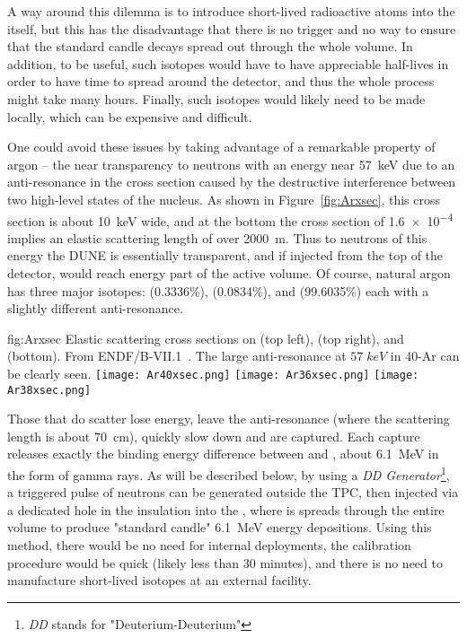 A way around this dilemma is to introduce short-lived radioactive atoms into the  itself, but this has the disadvantage that there is no trigger and no way to ensure that the standard candle decays spread out through the whole volume. In addition, to be useful, such isotopes would have to have appreciable half-lives in order to have time to spread around the detector, and thus the whole process might take many hours. Finally, such isotopes would likely need to be made locally, which can be expensive and difficult.

One could avoid these issues by %
taking advantage of a remarkable property of argon -- the near transparency to neutrons with an energy near \SI{57}{\keV} due to an anti-resonance in the cross section caused by the destructive interference between two high-level states of the  nucleus. As shown in Figure~\ref{fig:Arxsec}, this cross section is about \SI{10}{\keV} wide, and at the bottom the cross section of \num{1.6e-4} %
implies an elastic scattering length of over \SI{2000}{\m}. Thus to neutrons of this energy the DUNE  %
is essentially transparent, and if injected from the top of the detector, would reach energy part of the active volume.  Of course, natural argon has three major isotopes:  (0.3336\%),  (0.0834\%), and  (99.6035\%) each with a slightly different anti-resonance. 


\begin{dunefigure}{fig:Arxsec}
{Elastic scattering cross sections on  (top left),  (top right), and  (bottom). From ENDF/B-VII.1~\cite{ref:ENDF}. The large anti-resonance at $57\; keV$ in 40-Ar can be clearly seen.}
\texttt{[image: Ar40xsec.png]}
\texttt{[image: Ar36xsec.png]}
\texttt{[image: Ar38xsec.png]}
\end{dunefigure}
Those that do scatter lose energy, leave the anti-resonance (where the scattering length is about \SI{70}{\cm}), quickly slow down and are captured. Each capture releases exactly the binding energy difference between  and , about \SI{6.1}{\MeV} in the form of gamma rays.  As will be described below, by using a {\it DD Generator}\footnote{{\it DD} stands for "Deuterium-Deuterium" }, a triggered pulse of neutrons can be generated outside the TPC, then injected via a dedicated hole in the insulation into the , where is spreads through the entire volume to produce "standard candle" \SI{6.1}{\MeV} energy depositions. Using this method, there would be no need for internal deployments, the calibration procedure would be quick (likely less than 30 minutes), and there is no need to manufacture short-lived isotopes at an external facility.

